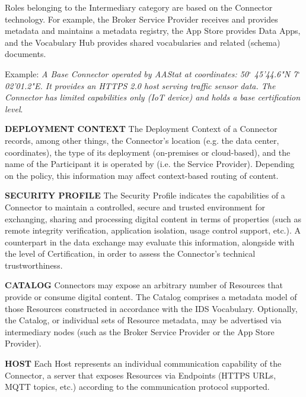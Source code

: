 Roles belonging to the Intermediary category are based on the Connector technology. For example, the Broker Service Provider receives and provides metadata and maintains a metadata registry, the App Store provides Data Apps, and the Vocabulary Hub provides shared vocabularies and related (schema) documents. 

Example: \textit{A Base Connector operated by AAStat at coordinates: 50$ ^{\circ} $ 45'44.6"N 7$ ^{\circ} $ 02'01.2"E. It provides an HTTPS 2.0 host serving traffic sensor data. The Connector has limited capabilities only (IoT device) and holds a base certification level}. 

\textbf{DEPLOYMENT CONTEXT }The Deployment Context of a Connector records, among other things, the Connector’s location (e.g. the data center, coordinates), the type of its deployment (on-premises or cloud-based), and the name of the Participant it is operated by (i.e. the Service Provider). Depending on the policy, this information may affect context-based routing of content. 

\textbf{SECURITY PROFILE} The Security Profile indicates the capabilities of a Connector to maintain a controlled, secure and trusted environment for exchanging, sharing and processing digital content in terms of properties (such as remote integrity verification, application isolation, usage control support, etc.). A counterpart in the data exchange may evaluate this information, alongside with the level of Certification, in order to assess the Connector’s technical trustworthiness. 

\textbf{CATALOG} Connectors may expose an arbitrary number of Resources that provide or consume digital content. The Catalog comprises a metadata model of those Resources constructed in accordance with the IDS Vocabulary. Optionally, the Catalog, or individual sets of Resource metadata, may be advertised via intermediary nodes (such as the Broker Service Provider or the App Store Provider).

\textbf{HOST} Each Host represents an individual communication capability of the Connector, a server that exposes Resources via Endpoints (HTTPS URLs, MQTT topics, etc.) according to the communication protocol supported.




